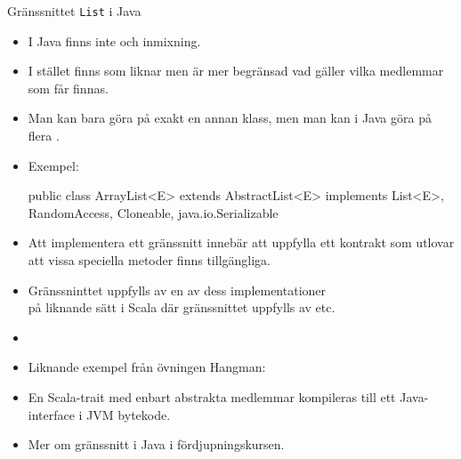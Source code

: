 \begin{Slide}{Gränssnittet \texttt{List} i Java}\SlideFontSmall
\begin{itemize}
\item I Java finns inte  och inmixning.

\item I stället finns  som liknar  men är mer begränsad vad gäller vilka medlemmar som får finnas.

\item Man kan bara göra  på exakt en annan klass, men man kan i Java göra  på flera .%

\item Exempel:
\begin{Code}[language=Java,backgroundcolor=\color{white},
  frame=none]
public class ArrayList<E> extends AbstractList<E>
    implements List<E>, RandomAccess, Cloneable, java.io.Serializable
\end{Code}

\item Att implementera ett gränssnitt innebär att uppfylla ett kontrakt som utlovar att vissa speciella metoder finns tillgängliga.

\item Gränssninttet  uppfylls av en av dess implementationer  \\

på liknande sätt i Scala där gränssnittet  uppfylls av  etc.

\item[] 

\item Liknande exempel från övningen Hangman: \\

\item En Scala-trait med enbart abstrakta medlemmar kompileras till ett Java-interface i JVM bytekode.

\item Mer om gränssnitt i Java i fördjupningskursen.

\end{itemize}
\end{Slide}

